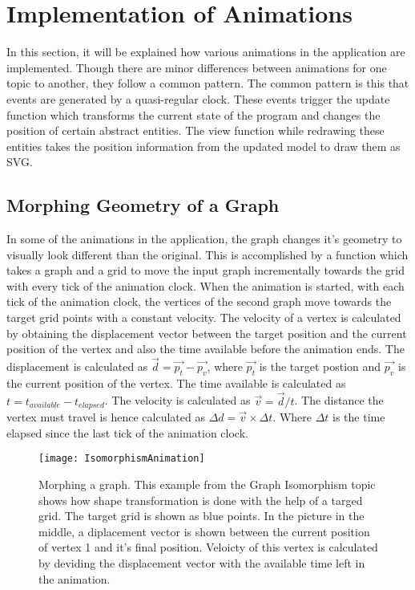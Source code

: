 \section{Implementation of Animations}
In this section, it will be explained how various animations in the
application are implemented. Though there are minor differences between animations
for one topic to another, they follow a common pattern. The common pattern is
this that events are generated by a quasi-regular clock. These events trigger
the update function which transforms the current state of the program and
changes the position of certain abstract entities. The view function while
redrawing these entities takes the position information from the updated model
to draw them as SVG.

\subsection{Morphing Geometry of a Graph}
\label{animation: morphing}
In some of the animations in the application, the graph changes it's geometry
to visually look different than the original. This is accomplished by a
function which takes a graph and a grid to move the input graph incrementally
towards the grid with every tick of the animation clock.  When the animation is
started, with each tick of the animation clock, the vertices of the second
graph move towards the target grid points with a constant velocity.  The
velocity of a vertex is calculated by obtaining the displacement vector between
the target position and the current position of the vertex and also the time
available before the animation ends.  The displacement is calculated as
$\vec{d} = \vec{p_t} - \vec{p_v}$, where $\vec{p_t}$ is the target postion and
$\vec{p_v}$ is the current position of the vertex. The time available is
calculated as $t = t_{available} - t_{elapsed}$. The velocity is calculated as
$\vec{v} = \vec{d}/t$.  The distance the vertex must travel is hence calculated
as $\Delta d = \vec{v} \times \Delta t$.  Where $\Delta t$ is the time elapsed
since the last tick of the animation clock.


\begin{figure}[h]
\centering
\texttt{[image: IsomorphismAnimation]}
\caption{
        Morphing a graph. This example from the Graph Isomorphism topic
        shows how shape transformation is done with the help of a targed grid.
        The target grid is shown as blue points. In the picture in the middle,
        a diplacement vector is shown between the current position of vertex 1
        and it's final position. Veloicty of this vertex is calculated by deviding
        the displacement vector with the available time left in the animation.
        }
\label{animationfigure: isomorphism}
\end{figure}

